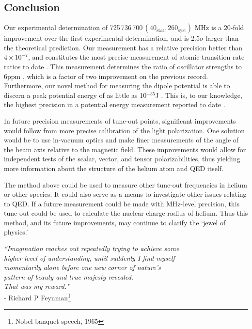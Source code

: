 \subsection{Conclusion}
	\label{sec:TO_conc}
	Our experimental determination of 725\,736\,700\,$(40_{\mathrm{stat}},260_{\mathrm{syst}})$ MHz is a \(20\)-fold improvement over the first experimental determination, and is 2.5$\sigma$ larger than the theoretical prediction. 
	Our measurement has a relative precision better than $4\times 10^{-7}$, and constitutes the most precise measurement of atomic transition rate ratios to date \cite{Mitroy13}.
	This measurement determines the ratio of oscillator strengths to 6ppm \cite{Henson22}, which is a factor of two improvement on the previous record. 
	Furthermore, our novel method for measuring the dipole potential is able to discern a peak potential energy of as little as 10$^{-35}$J . This is, to our knowledge, the highest precision in a potential energy measurement reported to date \cite{Henson22}.
	 
	In future precision measurements of tune-out points, significant improvements would follow from more precise calibration of the light polarization.
	One solution would be to use in-vacuum optics and make finer measurements of the angle of the beam axis relative to the magnetic field.
	These improvements would allow for independent tests of the scalar, vector, and tensor polarizabilities, thus yielding more information about the structure of the helium atom and QED itself.

	The method above could be used to measure other tune-out frequencies in helium or other species.
	It could also serve as a means to investigate other issues relating to QED. 
	If a future measurement could be made with MHz-level precision,  this tune-out could be used to calculate the nuclear charge radius of helium. 
	Thus this method, and its future improvements, may continue to  clarify the `jewel of physics.'

\vfill


\begin{flushright}
\singlespacing
{\emph{
``Imagination reaches out repeatedly trying to achieve some \\
higher level of understanding, until suddenly I find myself \\
momentarily alone before one new corner of nature’s \\
pattern of beauty and true majesty revealed. \\
That was my reward."}\\ 
- Richard P Feynman\footnote{Nobel banquet speech, 1965}}
\end{flushright}
\onehalfspacing




